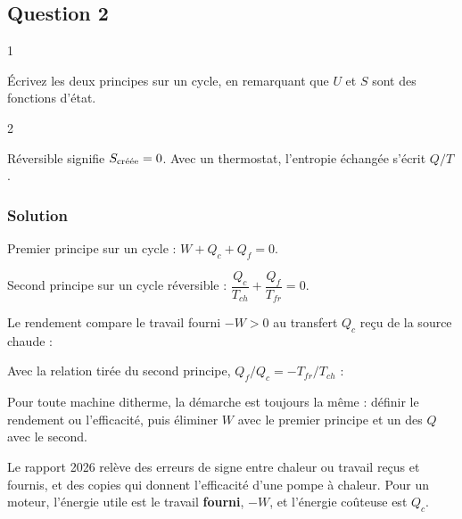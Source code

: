 \documentclass[11pt,a4paper]{article}
\newcommand{\equationajustee}[1]{%
  \sbox{\boiteequation}{$\displaystyle #1$}%
  \ifdim\wd\boiteequation>\linewidth
    \[\resizebox{\linewidth}{!}{\usebox{\boiteequation}}\]%
  \else
    \[#1\]%
  \fi}
\begin{document}
\hypertarget{question-2}{%
\subsection{Question 2}\label{question-2}}

\begin{indication}{1}

Écrivez les deux principes sur un cycle, en remarquant que \(U\) et \(S\) sont des fonctions d'état.

\end{indication}

\begin{indication}{2}

Réversible signifie \(S_{\text{\text{créée}}}=0\). Avec un thermostat, l'entropie échangée s'écrit \(Q/T\).

\end{indication}

\hypertarget{solution-1}{%
\subsubsection{Solution}\label{solution-1}}

Premier principe sur un cycle : \(W+Q_c+Q_f=0\).

Second principe sur un cycle réversible : \(\dfrac{Q_c}{T_{ch}}+\dfrac{Q_f}{T_{fr}}=0\).

Le rendement compare le travail fourni \(-W>0\) au transfert \(Q_c\) reçu de la source chaude :
\equationajustee{\begin{aligned}
\eta&=\frac{-W}{Q_c}\\
&=1+\frac{Q_f}{Q_c}
\end{aligned}}

Avec la relation tirée du second principe, \(Q_f/Q_c=-T_{fr}/T_{ch}\) :
\equationajustee{\boxed{\eta_C=1-\frac{T_{fr}}{T_{ch}}}}

\begin{methode}

Pour toute machine ditherme, la démarche est toujours la même : définir le rendement ou l'efficacité, puis éliminer \(W\) avec le premier principe et un des \(Q\) avec le second.

\end{methode}

\begin{piege}

Le rapport 2026 relève des erreurs de signe entre chaleur ou travail reçus et fournis, et des copies qui donnent l'efficacité d'une pompe à chaleur. Pour un moteur, l'énergie utile est le travail \textbf{fourni}, \(-W\), et l'énergie coûteuse est \(Q_c\).

\end{piege}
\end{document}
